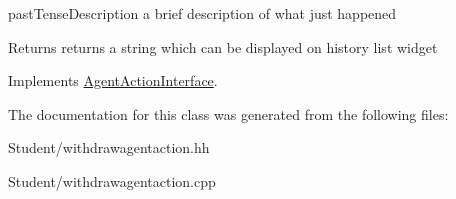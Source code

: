 past\-Tense\-Description a brief description of what just happened 

\begin{DoxyReturn}{Returns}
returns a string which can be displayed on history list widget 
\end{DoxyReturn}


Implements \hyperlink{class_agent_action_interface_a940bd8035e48c8682eb030be937df6e6}{Agent\-Action\-Interface}.



The documentation for this class was generated from the following files\-:\begin{DoxyCompactItemize}
\item 
Student/withdrawagentaction.\-hh\item 
Student/withdrawagentaction.\-cpp\end{DoxyCompactItemize}
